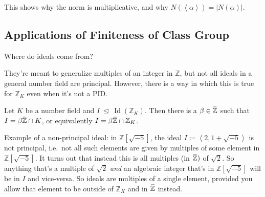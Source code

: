 \begin{remark}

This shows why the norm is multiplicative, and why
\(N( \left\langle{ \alpha }\right\rangle) = |N( \alpha ) |\).

\end{remark}

\hypertarget{applications-of-finiteness-of-class-group}{%
\subsection{Applications of Finiteness of Class
Group}\label{applications-of-finiteness-of-class-group}}

\begin{question}

Where do ideals come from?

\end{question}

\begin{remark}

They're meant to generalize multiples of an integer in \({\mathbb{Z}}\),
but not all ideals in a general number field are principal. However,
there is a way in which this is true for \({\mathbb{Z}}_K\) even when
it's not a PID.

\end{remark}

\begin{theorem}

Let \(K\) be a number field and
\(I{~\trianglelefteq~}\operatorname{Id}({\mathbb{Z}}_K)\). Then there is
a
\(\beta\in \mkern 1.5mu\overline{\mkern-1.5mu{\mathbb{Z}}\mkern-1.5mu}\mkern 1.5mu\)
such that
\(I = \beta \mkern 1.5mu\overline{\mkern-1.5mu{\mathbb{Z}}\mkern-1.5mu}\mkern 1.5mu \cap K\),
or equivalently
\(I = \beta \mkern 1.5mu\overline{\mkern-1.5mu{\mathbb{Z}}\mkern-1.5mu}\mkern 1.5mu \cap{\mathbb{Z}}_K\).

\end{theorem}

\begin{remark}

Example of a non-principal ideal: in \({\mathbb{Z}}[\sqrt{-5}]\), the
ideal \(I \coloneqq\left\langle{ 2, 1 + \sqrt{-5} }\right\rangle\) is
not principal, i.e.~not all such elements are given by multiples of some
element in \({\mathbb{Z}}[ \sqrt{-5} ]\). It turns out that instead this
is all multiples (in
\(\mkern 1.5mu\overline{\mkern-1.5mu{\mathbb{Z}}\mkern-1.5mu}\mkern 1.5mu)\)
of \(\sqrt{2}\). So anything that's a multiple of \(\sqrt{2}\)
\emph{and} an algebraic integer that's in \({\mathbb{Z}}[\sqrt{-5}]\)
will be in \(I\) and vice-versa. So ideals are multiples of a single
element, provided you allow that element to be outside of
\({\mathbb{Z}}_K\) and in
\(\mkern 1.5mu\overline{\mkern-1.5mu{\mathbb{Z}}\mkern-1.5mu}\mkern 1.5mu\)
instead.

\end{remark}

